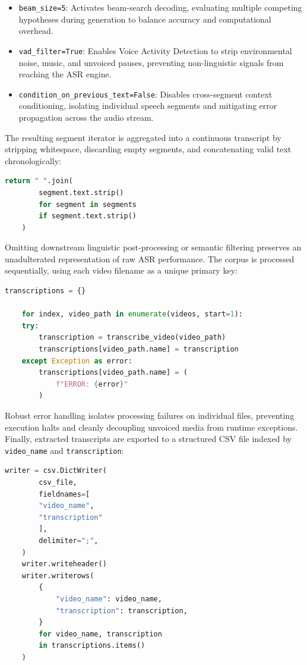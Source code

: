\begin{itemize}
    \item \texttt{beam\_size=5}: Activates beam-search decoding, evaluating multiple competing hypotheses during generation to balance accuracy and computational overhead.
    \item \texttt{vad\_filter=True}: Enables Voice Activity Detection to strip environmental noise, music, and unvoiced pauses, preventing non-linguistic signals from reaching the ASR engine.
    \item \texttt{condition\_on\_previous\_text=False}: Disables cross-segment context conditioning, isolating individual speech segments and mitigating error propagation across the audio stream.
\end{itemize}
The resulting segment iterator is aggregated into a continuous transcript by stripping whitespace, discarding empty segments, and concatenating valid text chronologically:
\begin{lstlisting}[language=Python]
    return " ".join(
        segment.text.strip()
        for segment in segments
        if segment.text.strip()
    )
\end{lstlisting}
Omitting downstream linguistic post-processing or semantic filtering preserves an unadulterated representation of raw ASR performance.
The corpus is processed sequentially, using each video filename as a unique primary key:
\begin{lstlisting}[language=Python]
    transcriptions = {}

    for index, video_path in enumerate(videos, start=1):
    try:
        transcription = transcribe_video(video_path)
        transcriptions[video_path.name] = transcription
    except Exception as error:
        transcriptions[video_path.name] = (
            f"ERROR: {error}"
        )
\end{lstlisting}
Robust error handling isolates processing failures on individual files, preventing execution halts and cleanly decoupling unvoiced media from runtime exceptions.
\\Finally, extracted transcripts are exported to a structured CSV file indexed by \texttt{video\_name} and \texttt{transcription}:\\
\begin{lstlisting}[language=Python]
    writer = csv.DictWriter(
        csv_file,
        fieldnames=[
        "video_name",
        "transcription"
        ],
        delimiter=";",
    )
    writer.writeheader()
    writer.writerows(
        {
            "video_name": video_name,
            "transcription": transcription,
        }
        for video_name, transcription
        in transcriptions.items()
    )
\end{lstlisting}

